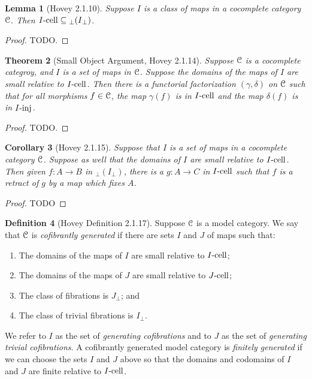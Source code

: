 \documentclass{amsart}
\theoremstyle{plain}
\newtheorem{theorem}{Theorem}[section]
\newtheorem{corollary}[theorem]{Corollary}
\newtheorem{lemma}[theorem]{Lemma}
\theoremstyle{definition}
\newtheorem{definition}[theorem]{Definition}
\newcommand{\sseq}{\subseteq}
\newcommand{\0}{\mathbf{0}}
\newcommand{\cC}{\mathcal C}
\newcommand{\p}{{_\perp}}
\renewcommand{\(}{\left(}
\renewcommand{\)}{\right)}
\def\scr{\EuScript}
\def\cC{\scr{C}}
\newcommand{\inj}{\text-\mathrm{inj}}
\newcommand{\cell}{\text-\mathrm{cell}}
\begin{document}
\begin{lemma}[Hovey 2.1.10]\label{2.1.10}
  Suppose $I$ is a class of maps in a cocomplete category $\cC$. Then $I\cell\sseq{\p(I\p)}$.
\end{lemma}
\begin{proof}
  \color{red}TODO.
\end{proof}

\begin{theorem}[Small Object Argument, Hovey 2.1.14]\label{2.1.14}
  Suppose $\cC$ is a cocomplete categroy, and $I$ is a set of maps in $\cC$. Suppose the domains of the maps of $I$ are small relative to $I\cell$. Then there is a functorial factorization $(\gamma,\delta)$ on $\cC$ such that for all morphisms $f\in\cC$, the map $\gamma(f)$ is in $I\cell$ and the map $\delta(f)$ is in $I\inj$.
\end{theorem}
\begin{proof}
  \color{red}TODO.
\end{proof}

\begin{corollary}[Hovey 2.1.15]\label{2.1.15}
  Suppose that $I$ is a set of maps in a cocomplete category $\cC$. Suppose as well that the domains of $I$ are small relative to $I\cell$. Then given $f:A\to B$ in $\p(I\p)$, there is a $g:A\to C$ in $I\cell$ such that $f$ is a retract of $g$ by a map which fixes $A$.
\end{corollary}
\begin{proof}
  \color{red}TODO
\end{proof}

\begin{definition}[Hovey Definition 2.1.17]\label{2.1.17}
  Suppose $\cC$ is a model category. We say that $\cC$ is \textit{cofibrantly generated} if there are sets $I$ and $J$ of maps such that:\begin{enumerate}[label=\arabic*.,noitemsep,topsep=0pt]
    \item The domains of the maps of $I$ are small relative to $I\cell$;
    \item The domains of the maps of $J$ are small relative to $J\cell$;
    \item The class of fibrations is $J\p$; and
    \item The class of trivial fibrations is $I\p$.
  \end{enumerate}
  We refer to $I$ as the set of \textit{generating cofibrations} and to $J$ as the set of \textit{generating trivial cofibrations}. A cofibrantly generated model category is \textit{finitely generated} if we can choose the sets $I$ and $J$ above so that the domains and codomains of $I$ and $J$ are finite relative to $I\cell$.
\end{definition}
\end{document}
